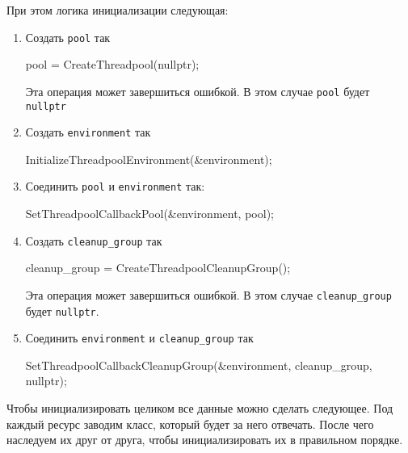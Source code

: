 При этом логика инициализации следующая:
\begin{enumerate}
\item Создать \verb"pool" так
\begin{cppcode}
pool = CreateThreadpool(nullptr);
\end{cppcode}
Эта операция может завершиться ошибкой.
В этом случае \verb"pool" будет \verb"nullptr"

\item Создать \verb"environment" так
\begin{cppcode}
InitializeThreadpoolEnvironment(&environment);
\end{cppcode}

\item Соединить \verb"pool" и \verb"environment" так:
\begin{cppcode}
SetThreadpoolCallbackPool(&environment, pool);
\end{cppcode}

\item Создать \verb"cleanup_group" так
\begin{cppcode}
cleanup_group = CreateThreadpoolCleanupGroup();
\end{cppcode}
Эта операция может завершиться ошибкой.
В этом случае \verb"cleanup_group" будет \verb"nullptr".

\item Соединить \verb"environment" и \verb"cleanup_group" так
\begin{cppcode}
SetThreadpoolCallbackCleanupGroup(&environment, cleanup_group, nullptr);
\end{cppcode}
\end{enumerate}
Чтобы инициализировать целиком все данные можно сделать следующее.
Под каждый ресурс заводим класс, который будет за него отвечать.
После чего наследуем их друг от друга, чтобы инициализировать их в правильном порядке.

